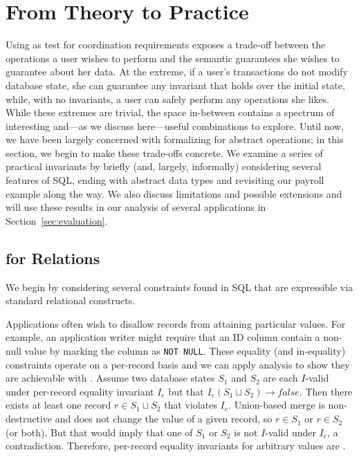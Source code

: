 
\section{From Theory to Practice}
\label{sec:bcc-practice}
\label{sec:merge}

Using \iconfluence as test for coordination requirements exposes a
trade-off between the operations a user wishes to perform and the
semantic guarantees she wishes to guarantee about her data. At the
extreme, if a user's transactions do not modify database state, she
can guarantee any invariant that holds over the initial state, while,
with no invariants, a user can safely perform any operations she
likes. While these extremes are trivial, the space in-between contains
a spectrum of interesting and---as we discuss here---useful
combinations to explore. Until now, we have been largely concerned
with formalizing \iconfluence for abstract operations; in this
section, we begin to make these trade-offs concrete. We examine a
series of practical invariants by briefly (and, largely, informally)
considering several features of SQL, ending with abstract data types
and revisiting our payroll example along the way. We also discuss
limitations and possible extensions and will use these results in our
analysis of several applications in Section~\ref{sec:evaluation}.

\subsection{\iconfluence for Relations}

We begin by considering several constraints found in SQL that are
expressible via standard relational constructs.

 Applications often wish to disallow records from
attaining particular values. For example, an application writer might
require that an ID column contain a non-null value by marking the
column as \texttt{NOT NULL}. These equality (and in-equality)
constraints operate on a per-record basis and we can apply
\iconfluence analysis to show they are achievable with
\cfreedom. Assume two database states $S_1$ and $S_2$ are each
$I$-valid under per-record equality invariant $I_e$ but that $I_e(S_1
\sqcup S_2)\rightarrow false$. Then there exists at least one record
$r \in S_1 \sqcup S_2$ that violates $I_e$. Union-based merge is
non-destructive and does not change the value of a given record, so $r
\in S_1$ or $r \in S_2$ (or both). But that would imply that one of
$S_1$ or $S_2$ is not $I$-valid under $I_e$, a
contradiction. Therefore, per-record equality invariants for arbitrary
values are \iconfluent.

